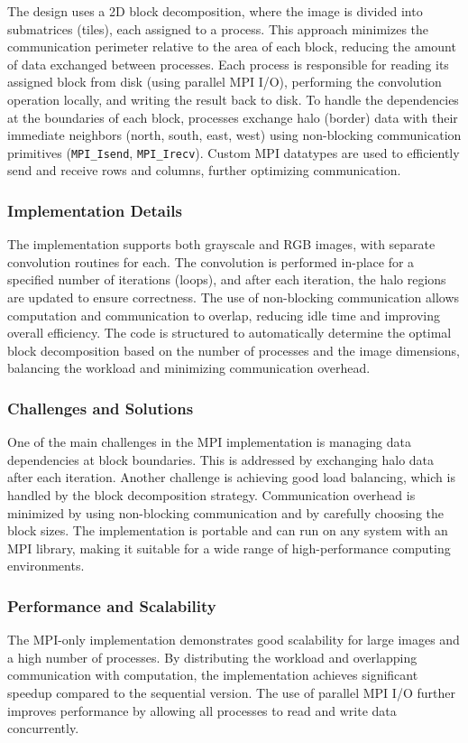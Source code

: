 \documentclass[conference, 10pt]{IEEEtran}
\begin{document}
The design uses a 2D block decomposition, where the image is divided into submatrices (tiles), each assigned to a process. This approach minimizes the communication perimeter relative to the area of each block, reducing the amount of data exchanged between processes. Each process is responsible for reading its assigned block from disk (using parallel MPI I/O), performing the convolution operation locally, and writing the result back to disk. To handle the dependencies at the boundaries of each block, processes exchange halo (border) data with their immediate neighbors (north, south, east, west) using non-blocking communication primitives (\texttt{MPI\_Isend}, \texttt{MPI\_Irecv}). Custom MPI datatypes are used to efficiently send and receive rows and columns, further optimizing communication.

\subsubsection{Implementation Details}
The implementation supports both grayscale and RGB images, with separate convolution routines for each. The convolution is performed in-place for a specified number of iterations (loops), and after each iteration, the halo regions are updated to ensure correctness. The use of non-blocking communication allows computation and communication to overlap, reducing idle time and improving overall efficiency. The code is structured to automatically determine the optimal block decomposition based on the number of processes and the image dimensions, balancing the workload and minimizing communication overhead.

\subsubsection{Challenges and Solutions}
One of the main challenges in the MPI implementation is managing data dependencies at block boundaries. This is addressed by exchanging halo data after each iteration. Another challenge is achieving good load balancing, which is handled by the block decomposition strategy. Communication overhead is minimized by using non-blocking communication and by carefully choosing the block sizes. The implementation is portable and can run on any system with an MPI library, making it suitable for a wide range of high-performance computing environments.

\subsubsection{Performance and Scalability}
The MPI-only implementation demonstrates good scalability for large images and a high number of processes. By distributing the workload and overlapping communication with computation, the implementation achieves significant speedup compared to the sequential version. The use of parallel MPI I/O further improves performance by allowing all processes to read and write data concurrently.
\end{document}
